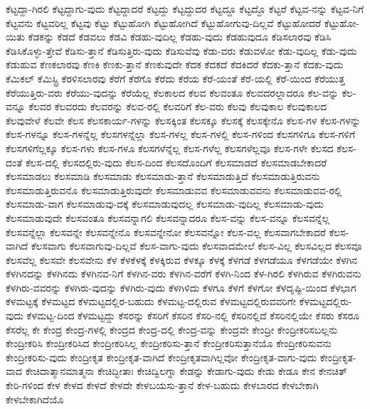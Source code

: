 {ಕೆಟ್ಟದ್ದಾ-ಗಿರಲಿ
ಕೆಟ್ಟದ್ದಾಗು-ವುದು
ಕೆಟ್ಟದ್ದಾದರೆ
ಕೆಟ್ಟದ್ದು
ಕೆಟ್ಟದ್ದುದರ
ಕೆಟ್ಟದ್ದೂ
ಕೆಟ್ಟದ್ದೊ
ಕೆಟ್ಟರೆ
ಕೆಟ್ಟವ-ನನ್ನು
ಕೆಟ್ಟವ-ನಿಗೆ
ಕೆಟ್ಟವನು
ಕೆಟ್ಟವರಿಲ್ಲ
ಕೆಟ್ಟವು
ಕೆಟ್ಟು
ಕೆಟ್ಟುಹೋಗಿ
ಕೆಟ್ಟುಹೋಗಿದೆ
ಕೆಟ್ಟುಹೋಗುವು-ದಿಲ್ಲವೆ
ಕೆಟ್ಟುಹೋದರೆ
ಕೆಟ್ಟುಹೋ-ಯಿತು
ಕೆಡಕನ್ನು
ಕೆಡದೆ
ಕೆಡವಲು
ಕೆಡವಿ
ಕೆಡಹು-ವುದಿಲ್ಲ
ಕೆಡಹು-ವುದು
ಕೆಡಹುವುದೂ
ಕೆಡಿಸಲಾರವು
ಕೆಡಿಸಿ
ಕೆಡಿಸಿಕೊಳ್ಳು-ತ್ತೇವೆ
ಕೆಡಿಸು-ತ್ತಾನೆ
ಕೆಡಿಸುತ್ತಿರು-ವುದು
ಕೆಡಿಸುವೆವು
ಕೆಡು-ವರು
ಕೆಡುವಳೋ
ಕೆಡು-ವುದಿಲ್ಲ
ಕೆಡು-ವುದು
ಕೆಡುಹುವ
ಕೆಣಕಲಾರವು
ಕೆಣಕಿ
ಕೆಣಕು-ತ್ತಾನೆ
ಕೆಣಕುವುದೇ
ಕೆದಕ
ಕೆದಕದೆ
ಕೆದಕಿದರೆ
ಕೆದಕು-ತ್ತಾನೆ
ಕೆದಕು-ವುದು
ಕೆಮಿಕಲ್
ಕೆಮಿಸ್ಟ್ರಿ
ಕೆರಳಿಸಲಾರವು
ಕೆರೆಗೆ
ಕೆರೆಗೊ
ಕೆರೆದು
ಕೆರೆಯ
ಕೆರೆ-ಯಂತೆ
ಕೆರೆ-ಯಲ್ಲಿ
ಕೆರೆ-ಯಿಂದ
ಕೆರೆಯುತ್ತ
ಕೆರೆಯುತ್ತಿರು-ವರು
ಕೆರೆಯು-ವುದನ್ನು
ಕೆರೆಯೆಲ್ಲ
ಕೆಲಕಾಲದ
ಕೆಲವ
ಕೆಲವಂತೂ
ಕೆಲವದರಲ್ಲಾದರೂ
ಕೆಲ-ವನ್ನು
ಕೆಲ-ವನ್ನೂ
ಕೆಲವರ
ಕೆಲವರದು
ಕೆಲವರನ್ನು
ಕೆಲವ-ರಲ್ಲಿ
ಕೆಲವರಿಗೆ
ಕೆಲ-ವರು
ಕೆಲವು
ಕೆಲವುಕಾಲ
ಕೆಲವುಕಾಲದ
ಕೆಲವುವೇಳೆ
ಕೆಲವೇ
ಕೆಲಸ
ಕೆಲಸಕಾರ್ಯ-ಗಳನ್ನು
ಕೆಲಸಕ್ಕಿಂತ
ಕೆಲಸಕ್ಕೂ
ಕೆಲಸಕ್ಕೆ
ಕೆಲಸಕ್ಕೇನೊ
ಕೆಲಸ-ಗಳ
ಕೆಲಸ-ಗಳನ್ನು
ಕೆಲಸ-ಗಳನ್ನೂ
ಕೆಲಸ-ಗಳನ್ನೆಲ್ಲ
ಕೆಲಸಗಳನ್ನೆಲ್ಲಾ
ಕೆಲಸ-ಗಳಲ್ಲ
ಕೆಲಸ-ಗಳಲ್ಲಿ
ಕೆಲಸ-ಗಳಿಂದ
ಕೆಲಸಗಳಿಗೂ
ಕೆಲಸ-ಗಳಿಗೆ
ಕೆಲಸಗಳಿಗೆಲ್ಲಕ್ಕೂ
ಕೆಲಸ-ಗಳು
ಕೆಲಸ-ಗಳೂ
ಕೆಲಸಗಳೆನ್ನೆಲ್ಲ
ಕೆಲಸ-ಗಳೆಲ್ಲ
ಕೆಲಸಗಳೆಲ್ಲವೂ
ಕೆಲಸ-ಗಳೇ
ಕೆಲಸದ
ಕೆಲಸ-ದಂತೆ
ಕೆಲಸ-ದಲ್ಲಿ
ಕೆಲಸದಲ್ಲಿರು-ವುದು
ಕೆಲಸ-ದಿಂದ
ಕೆಲಸದೊಂದಿಗೆ
ಕೆಲಸಮಾಡದೆ
ಕೆಲಸಮಾಡಬೇಕಾದರೆ
ಕೆಲಸಮಾಡಲು
ಕೆಲಸಮಾಡಿ
ಕೆಲಸಮಾಡು
ಕೆಲಸಮಾಡು-ತ್ತಾನೆ
ಕೆಲಸಮಾಡುತ್ತಿದೆ
ಕೆಲಸಮಾಡುತ್ತಿರುವನು
ಕೆಲಸಮಾಡುತ್ತಿರುವನೊ
ಕೆಲಸಮಾಡುತ್ತಿರುವುದೇ
ಕೆಲಸಮಾಡುವವ
ಕೆಲಸಮಾಡುವವನು
ಕೆಲಸಮಾಡುವವ-ರಲ್ಲಿ
ಕೆಲಸಮಾಡು-ವಾಗ
ಕೆಲಸಮಾಡುವು-ದಕ್ಕೆ
ಕೆಲಸಮಾಡುವುದಲ್ಲ
ಕೆಲಸಮಾಡು-ವುದಿಲ್ಲ
ಕೆಲಸಮಾಡು-ವುದು
ಕೆಲಸಮಾಡುವುದೇ
ಕೆಲಸವಂತೂ
ಕೆಲಸವನ್ನಾಗಲಿ
ಕೆಲಸವನ್ನಾದರೂ
ಕೆಲಸ-ವನ್ನು
ಕೆಲಸ-ವನ್ನೂ
ಕೆಲಸವನ್ನೆಲ್ಲ
ಕೆಲಸವನ್ನೆಲ್ಲಾ
ಕೆಲಸವನ್ನೇ
ಕೆಲಸವನ್ನೇನೊ
ಕೆಲಸವನ್ನೇನೋ
ಕೆಲಸವನ್ನೋ
ಕೆಲಸ-ವಲ್ಲ
ಕೆಲಸವಾಗಬೇಕಾದರೆ
ಕೆಲಸ-ವಾಗಿದೆ
ಕೆಲಸವಾಗು
ಕೆಲಸವಾಗುವು-ದಿಲ್ಲವೆ
ಕೆಲಸ-ವಾಗು-ವುದು
ಕೆಲಸವಾದಮೇಲೆ
ಕೆಲಸ-ವಿಲ್ಲ
ಕೆಲಸವಿಲ್ಲದ
ಕೆಲಸವೂ
ಕೆಲಸವೆಲ್ಲ
ಕೆಲಸವೇ
ಕೆಲಸವೇನು
ಕೆಳ
ಕೆಳಕೆಳಕ್ಕೆ
ಕೆಳಕ್ಕಿರುವ
ಕೆಳಕ್ಕೂ
ಕೆಳಕ್ಕೆ
ಕೆಳಗಡೆ
ಕೆಳಗಡೆಯೂ
ಕೆಳಗಡೆಯೇ
ಕೆಳಗಿನ
ಕೆಳಗಿನದನ್ನು
ಕೆಳಗಿನದು
ಕೆಳಗಿನವ-ನಿಗೆ
ಕೆಳಗಿನ-ವರು
ಕೆಳಗಿನ-ವರೆಗೆ
ಕೆಳಗಿ-ನಿಂದ
ಕೆಳ-ಗಿರಲಿ
ಕೆಳಗಿರುವ
ಕೆಳಗಿರುವನು
ಕೆಳಗಿರು-ವವರನ್ನು
ಕೆಳಗಿರು-ವುದನ್ನು
ಕೆಳಗಿರು-ವುದು
ಕೆಳಗಿಳಿದು
ಕೆಳಗೂ
ಕೆಳಗೆ
ಕೆಳಗೋ
ಕೆಳದೃಷ್ಟಿ-ಯಿಂದ
ಕೆಳಭಾಗ
ಕೆಳಮಟ್ಟಕ್ಕೆ
ಕೆಳಮಟ್ಟದ
ಕೆಳಮಟ್ಟದಲ್ಲಿರ-ಬಹುದು
ಕೆಳಮಟ್ಟ-ದಲ್ಲಿರುವ
ಕೆಳಮಟ್ಟದಲ್ಲಿರುವವರಿಗೇ
ಕೆಳಮಟ್ಟದಲ್ಲಿರು-ವುದು
ಕೆಳಮಟ್ಟ-ದಿಂದ
ಕೆಳಮಟ್ಟದ್ದು
ಕೆಸರನ್ನು
ಕೆಸರಿಗೆ
ಕೆಸರಿನ
ಕೆಸರಿ-ನಲ್ಲಿ
ಕೆಸರಿನಲ್ಲಿದೆ
ಕೆಸರಿನಲ್ಲಿಯೇ
ಕೆಸರು
ಕೆಸರೂ
ಕೆಸರೆಲ್ಲ
ಕೇ
ಕೇಂದ್ರ
ಕೇಂದ್ರ-ಗಳಲ್ಲಿ
ಕೇಂದ್ರದ
ಕೇಂದ್ರ-ದಲ್ಲಿ
ಕೇಂದ್ರ-ವನ್ನು
ಕೇಂದ್ರವೇ
ಕೇಂದ್ರೀ
ಕೇಂದ್ರೀಕರಿಸಬಲ್ಲನು
ಕೇಂದ್ರೀಕರಿಸಿ
ಕೇಂದ್ರೀಕರಿಸಿದ
ಕೇಂದ್ರೀಕರಿಸಿಲ್ಲ
ಕೇಂದ್ರೀಕರಿಸು-ತ್ತಾನೆ
ಕೇಂದ್ರೀಕರಿಸುತ್ತಾನೆಯೊ
ಕೇಂದ್ರೀಕರಿಸುವನು
ಕೇಂದ್ರೀಕರಿಸು-ವುದು
ಕೇಂದ್ರೀಕೃತ
ಕೇಂದ್ರೀಕೃತ-ವಾಗಿದೆ
ಕೇಂದ್ರೀಕೃತವಾಗಿಲ್ಲವೋ
ಕೇಂದ್ರೀಕೃತ-ವಾಗು-ವುದು
ಕೇಂದ್ರೀಕೃತ-ವಾದ
ಕೇಚಿದಾತ್ಮಾನಮಾತ್ಮನಾ
ಕೇಚಿದ್ಭೀತಾಃ
ಕೇಚಿದ್ವಿಲಗ್ನಾ
ಕೇಡನ್ನು
ಕೇಡಾಗು-ವುದು
ಕೇಡು
ಕೇಡೂ
ಕೇನ
ಕೇನಚಿತ್
ಕೇರಿ-ಗಳಿಂದ
ಕೇಳ
ಕೇಳದ
ಕೇಳದೆ
ಕೇಳದೇ
ಕೇಳಬಯಸು-ತ್ತಾನೆ
ಕೇಳ-ಬಹುದು
ಕೇಳಬಾರದ
ಕೇಳಬೇಕಾಗಿ
ಕೇಳಬೇಕಾಗಿದೆಯೊ
}
